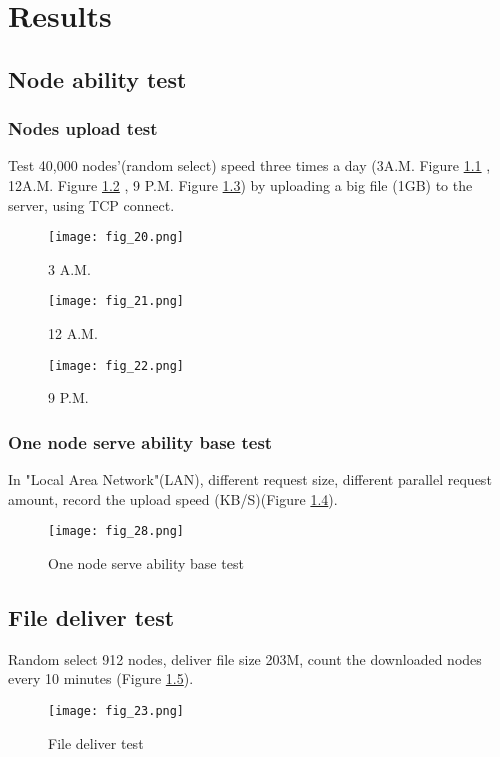 \chapter{Results}
\label{chap:chap-four}
\section{Node ability test}
\subsection{Nodes upload test}
 Test 40,000 nodes'(random select) speed  three times a day (3A.M. Figure \ref{fig_20} ,
12A.M. Figure \ref{fig_21} , 9 P.M. Figure \ref{fig_22})
by uploading a big file (1GB) to the server, using TCP connect.


\begin{figure}[htbp]
\centering
	  \texttt{[image: fig\_20.png]}
    \caption{3 A.M.}
 \label{fig_20}
\end{figure}

\begin{figure}[htbp]
\centering
	  \texttt{[image: fig\_21.png]}
    \caption{12 A.M.}
 \label{fig_21}
\end{figure}

\begin{figure}[htbp]
\centering
	  \texttt{[image: fig\_22.png]}
    \caption{9 P.M.}
 \label{fig_22}
\end{figure}

\subsection{One node serve ability base test}
In "Local Area Network"(LAN), different request size, different parallel request amount,
record the upload speed (KB/S)(Figure \ref{fig_28}).

\begin{figure}[htbp]
\centering
	  \texttt{[image: fig\_28.png]}
    \caption{One node serve ability base test}
 \label{fig_28}
\end{figure}

\section{File deliver test}

Random select 912 nodes, deliver file size 203M, count the downloaded nodes every 10 minutes
(Figure \ref{fig_23}).
\begin{figure}[htbp]
\centering
	  \texttt{[image: fig\_23.png]}
    \caption{File deliver test}
 \label{fig_23}
\end{figure}
